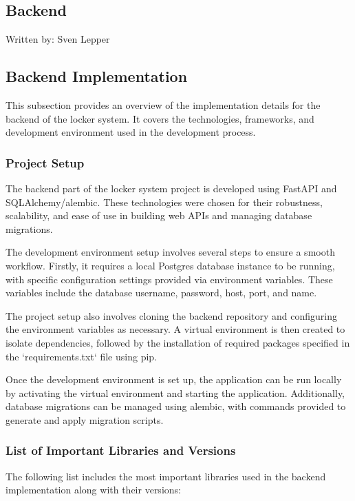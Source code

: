 \subsection{Backend}
{\tiny Written by: Sven Lepper}\\

\subsection{Backend Implementation} \label{sec:Implementation_Backend}

This subsection provides an overview of the implementation details for the backend of the locker system. It covers the technologies, frameworks, and development environment used in the development process.

\subsubsection{Project Setup}

The backend part of the locker system project is developed using FastAPI and SQLAlchemy/alembic. These technologies were chosen for their robustness, scalability, and ease of use in building web APIs and managing database migrations.

The development environment setup involves several steps to ensure a smooth workflow. Firstly, it requires a local Postgres database instance to be running, with specific configuration settings provided via environment variables. These variables include the database username, password, host, port, and name.

The project setup also involves cloning the backend repository and configuring the environment variables as necessary. A virtual environment is then created to isolate dependencies, followed by the installation of required packages specified in the `requirements.txt` file using pip.

Once the development environment is set up, the application can be run locally by activating the virtual environment and starting the application. Additionally, database migrations can be managed using alembic, with commands provided to generate and apply migration scripts.

\subsubsection{List of Important Libraries and Versions}

The following list includes the most important libraries used in the backend implementation along with their versions:


